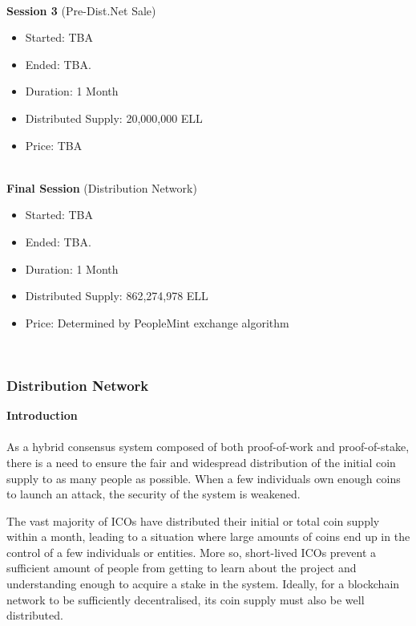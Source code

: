 \noindent
\\\textbf{Session 3} (Pre-Dist.Net Sale)

\begin{itemize}
	\item Started: TBA
	\item Ended: TBA.
	\item Duration: 1 Month
	\item Distributed Supply: 20,000,000 ELL
	\item Price: TBA
\end{itemize}

\noindent
\\\textbf{Final Session} (Distribution Network)

\begin{itemize}
	\item Started: TBA
	\item Ended: TBA.
	\item Duration: 1 Month
	\item Distributed Supply: 862,274,978 ELL
	\item Price: Determined by PeopleMint exchange algorithm
\end{itemize}\\



\subsubsection{Distribution Network} 
\vspace{5mm}
\textbf{Introduction}
\\\\As a hybrid consensus system composed of both proof-of-work and proof-of-stake, there is a need to ensure the fair and widespread distribution of the initial coin supply to as many people as possible. When a few individuals own enough coins to launch an attack, the security of the system is weakened.

The vast majority of ICOs have distributed their initial or total coin supply within a month, leading to a situation where large amounts of coins end up in the control of a few individuals or entities. More so, short-lived ICOs prevent a sufficient amount of people from getting to learn about the project and understanding enough to acquire a stake in the system. Ideally, for a blockchain network to be sufficiently decentralised, its coin supply must also be well distributed. \\\\


